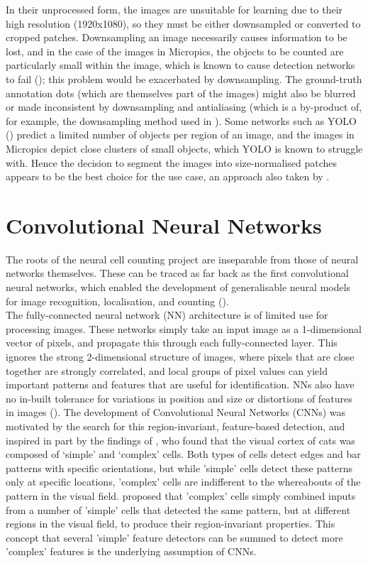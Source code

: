 In their unprocessed form, the images are unsuitable for learning due to their high resolution (1920x1080), so they must be either downsampled or converted to cropped patches. Downsampling an image necessarily causes information to be lost, and in the case of the images in Micropics, the objects to be counted are particularly small within the image, which is known to cause detection networks to fail (\cite{redmon2016look}); this problem would be exacerbated by downsampling. The ground-truth annotation dots (which are themselves part of the images) might also be blurred or made inconsistent by downsampling and antialiasing (which is a by-product of, for example, the downsampling method used in \cite{LeCun-1998}). Some networks such as YOLO (\cite{redmon2016look}) predict a limited number of objects per region of an image, and the images in Micropics depict close clusters of small objects, which YOLO is known to struggle with. Hence the decision to segment the images into size-normalised patches appears to be the best choice for the use case, an approach also taken by \cite{xie2018microscopy}.

\section{Convolutional Neural Networks}
The roots of the neural cell counting project are inseparable from those of neural networks themselves. These can be traced as far back as the first convolutional neural networks, which enabled the development of generalisable neural models for image recognition, localisation, and counting (\cite{LeCun-et-al-2015}).\\

The fully-connected neural network (NN) architecture is of limited use for processing images. These networks simply take an input image as a 1-dimensional vector of pixels, and propagate this through each fully-connected layer. This ignores the strong 2-dimensional structure of images, where pixels that are close together are strongly correlated, and local groups of pixel values can yield important patterns and features that are useful for identification. NNs also have no in-built tolerance for variations in position and size or distortions of features in images (\cite{LeCun-et-al-2015, LeCun-1998}). The development of Convolutional Neural Networks (CNNs) was motivated by the search for this region-invariant, feature-based detection, and inspired in part by the findings of \cite{hubel1962receptive}, who found that the visual cortex of cats was composed of ‘simple’ and ‘complex’ cells. Both types of cells detect edges and bar patterns with specific orientations, but while 'simple' cells detect these patterns only at specific locations, 'complex' cells are indifferent to the whereabouts of the pattern in the visual field. \cite{hubel1962receptive} proposed that 'complex' cells simply combined inputs from a number of 'simple' cells that detected the same pattern, but at different regions in the visual field, to produce their region-invariant properties. This concept that several 'simple' feature detectors can be summed to detect more 'complex' features is the underlying assumption of CNNs.\\

